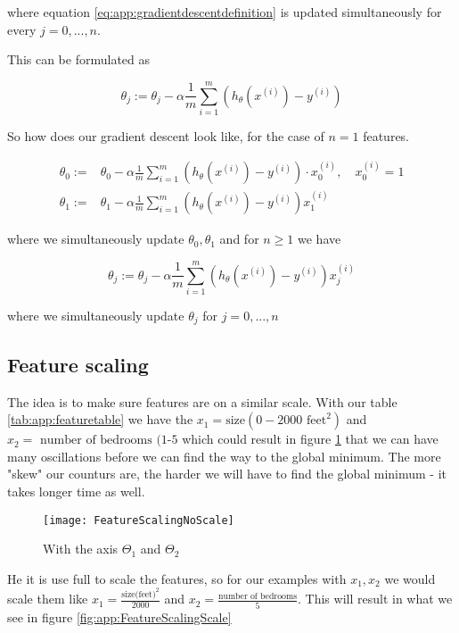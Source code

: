 where equation \ref{eq:app:gradientdescentdefinition} is updated simultaneously for every $j=0,...,n$.

This can be formulated as

\[
  \theta_j := \theta_j - \alpha \frac{1}{m}\sum_{i=1}^{m}(h_\theta(x^{(i)}) - y^{(i)})
\]

So how does our gradient descent look like, for the case of $n=1$ features.

\begin{align}\label{eq:app:n=1features}
  \theta_0 := & \theta_0 - \alpha \frac{1}{m}\sum_{i=1}^{m}(h_\theta(x^{(i)}) - y^{(i)})\cdot x^{(i)}_0, \quad x^{(i)}_0 = 1\\
  \theta_1 := & \theta_1 - \alpha \frac{1}{m}\sum_{i=1}^{m}(h_\theta(x^{(i)}) - y^{(i)})x^{(i)}_1
\end{align}

where we simultaneously update $\theta_0,\theta_1$ and for $n\geq 1$ we have

\[
  \theta_j := \theta_j - \alpha \frac{1}{m}\sum_{i=1}^{m}(h_\theta(x^{(i)}) - y^{(i)})x^{(i)}_j
\]

where we simultaneously update $\theta_j$ for $j=0,...,n$

\subsection{Feature scaling}

The idea is to make sure features are on a similar scale. With our table \ref{tab:app:featuretable} we have the $x_1 = \text{size}(0-2000 \text{ feet}^2)$ and $x_2 = \text{ number of bedrooms (1-5}$ which could result in figure \ref{fig:app:FeatureScalingNoScale} that we can have many oscillations before we can find the way to the global minimum. The more "skew" our counturs are, the harder we will have to find the global minimum - it takes longer time as well.

\begin{figure}[H]
  \centering
  \texttt{[image: FeatureScalingNoScale]}
  \caption{With the axis $\Theta_1$ and $\Theta_2$}\label{fig:app:FeatureScalingNoScale}
\end{figure}

He it is use full to scale the features, so for our examples with $x_1, x_2$ we would scale them like $x_1 = \frac{\text{size(feet)}^2}{2000}$ and $x_2=\frac{\text{number of bedrooms}}{5}$. This will result in what we see in figure \ref{fig:app:FeatureScalingScale}

